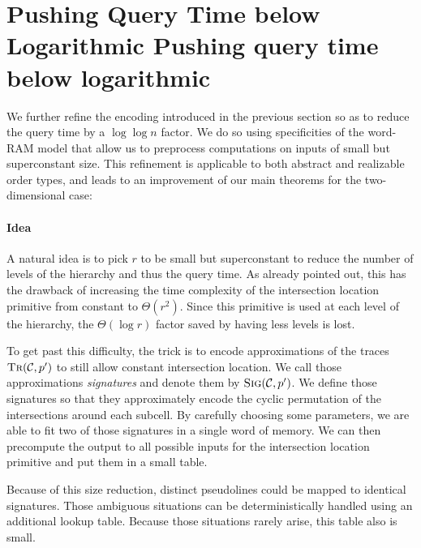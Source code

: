 \section{\iftitlecase%
Pushing Query Time below Logarithmic\else%
Pushing query time below logarithmic\fi}\label{sec:query-time}

We further refine the encoding introduced in the previous section so as to
reduce the query time by a \( \log\log n \) factor. We do so using
specificities of the word-RAM model that allow us to preprocess computations
on inputs of small but superconstant size.
%
This refinement is applicable to both abstract and realizable order types,
and leads to an improvement of our main theorems for the two-dimensional case:
%




\paragraph{Idea}

A natural idea is to pick \(r\) to be small but superconstant to reduce the
number of levels of the hierarchy and thus the query time. As already pointed
out, this has the drawback of increasing the time complexity of the intersection
location primitive from constant to \(\Theta(r^2)\).
Since this primitive is used at each level of the hierarchy, the
\(\Theta(\log r)\) factor saved by having less levels is lost.

To get past this difficulty,
the trick is to encode approximations of the traces
\(\textsc{Tr}(\mathcal{C}, p')\) to still allow constant intersection location.
We call those approximations \emph{signatures} and denote them by
\(\textsc{Sig}(\mathcal{C}, p')\).
%
We define those signatures so that they approximately encode the cyclic
permutation of the intersections around each subcell. By carefully choosing some
parameters, we are able to fit two of those signatures in a single word of
memory. We can then precompute the output to all
possible inputs for the intersection location primitive and put them in a small
table.

Because of this size reduction, distinct pseudolines could
be mapped to identical signatures.
%
Those ambiguous situations can be deterministically handled using
an additional lookup table.
%
Because those situations rarely arise, this table also is small.

